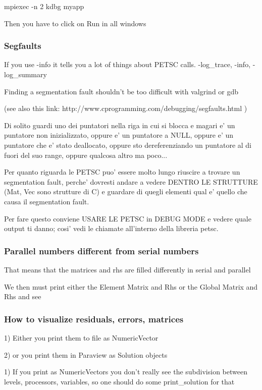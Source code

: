 \documentclass[10pt]{book}
\begin{document}
 mpiexec -n 2 kdbg myapp
 
 Then you have to click on Run in all windows
 
 \subsubsection{Segfaults}

If you use -info it tells you a lot of things about PETSC calls.
-log\_trace, -info, -log\_summary

Finding a segmentation fault shouldn't be too difficult with valgrind or gdb

(see also this link:
http://www.cprogramming.com/debugging/segfaults.html )

Di solito guardi uno dei puntatori nella riga in cui si 
blocca e magari e' un puntatore non inizializzato,
oppure e' un puntatore a NULL, 
oppure e' un puntatore che e' stato deallocato,
oppure sto dereferenziando un puntatore al di fuori del suo range,
oppure qualcosa altro ma poco...

Per quanto riguarda le PETSC puo' essere molto lungo riuscire 
a trovare un segmentation fault, perche' dovresti 
andare a vedere DENTRO LE STRUTTURE (Mat, Vec sono strutture di C)
e guardare di quegli elementi qual e' quello 
che causa il segmentation fault.

Per fare questo conviene USARE LE PETSC in DEBUG MODE 
e vedere quale output ti danno;
cosi' vedi le chiamate all'interno della libreria petsc.


  \subsubsection{Parallel numbers different from serial numbers}
  
  
  That means that the matrices and rhs are filled differently in serial and parallel
  
  We then must print either the Element Matrix and Rhs or the Global Matrix and Rhs 
  and see

  \subsubsection{How to visualize residuals, errors, matrices}
  
 1)  Either you print them to file as NumericVector
  
 2)  or you print them in Paraview as Solution objects
  
  1) If you print as NumericVectors you don't really see the subdivision between levels, processors, variables,
     so one should do some print\_solution for that
     
\end{document}
